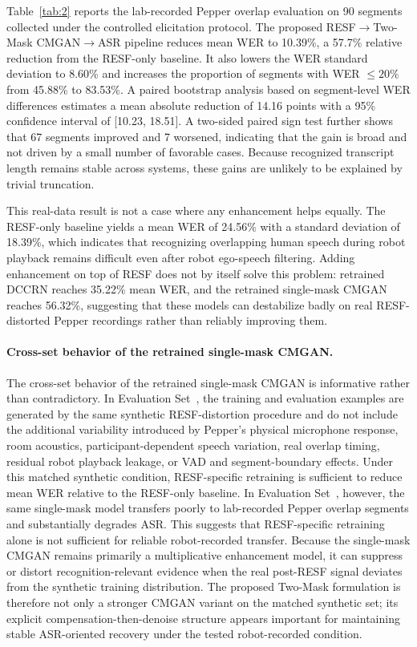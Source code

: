 \documentclass[manuscript,screen,review]{acmart}
\newcommand{\RomanNumeralCaps}[1]
    {\MakeUppercase{\romannumeral #1}}
\begin{document}
Table~\ref{tab:2} reports the lab-recorded Pepper overlap evaluation on 90 segments collected under the controlled elicitation protocol. The proposed RESF$\rightarrow$Two-Mask CMGAN$\rightarrow$ASR pipeline reduces mean WER to 10.39\%, a 57.7\% relative reduction from the RESF-only baseline. It also lowers the WER standard deviation to 8.60\% and increases the proportion of segments with WER $\leq 20\%$ from 45.88\% to 83.53\%. A paired bootstrap analysis based on segment-level WER differences estimates a mean absolute reduction of 14.16 points with a 95\% confidence interval of [10.23, 18.51]. A two-sided paired sign test further shows that 67 segments improved and 7 worsened, indicating that the gain is broad and not driven by a small number of favorable cases. Because recognized transcript length remains stable across systems, these gains are unlikely to be explained by trivial truncation.

This real-data result is not a case where any enhancement helps equally. The RESF-only baseline yields a mean WER of 24.56\% with a standard deviation of 18.39\%, which indicates that recognizing overlapping human speech during robot playback remains difficult even after robot ego-speech filtering. Adding enhancement on top of RESF does not by itself solve this problem: retrained DCCRN reaches 35.22\% mean WER, and the retrained single-mask CMGAN reaches 56.32\%, suggesting that these models can destabilize badly on real RESF-distorted Pepper recordings rather than reliably improving them.

\paragraph{Cross-set behavior of the retrained single-mask CMGAN.}
The cross-set behavior of the retrained single-mask CMGAN is informative rather than contradictory. In Evaluation Set~\RomanNumeralCaps{1}, the training and evaluation examples are generated by the same synthetic RESF-distortion procedure and do not include the additional variability introduced by Pepper's physical microphone response, room acoustics, participant-dependent speech variation, real overlap timing, residual robot playback leakage, or VAD and segment-boundary effects. Under this matched synthetic condition, RESF-specific retraining is sufficient to reduce mean WER relative to the RESF-only baseline. In Evaluation Set~\RomanNumeralCaps{3}, however, the same single-mask model transfers poorly to lab-recorded Pepper overlap segments and substantially degrades ASR. This suggests that RESF-specific retraining alone is not sufficient for reliable robot-recorded transfer. Because the single-mask CMGAN remains primarily a multiplicative enhancement model, it can suppress or distort recognition-relevant evidence when the real post-RESF signal deviates from the synthetic training distribution. The proposed Two-Mask formulation is therefore not only a stronger CMGAN variant on the matched synthetic set; its explicit compensation-then-denoise structure appears important for maintaining stable ASR-oriented recovery under the tested robot-recorded condition.
\end{document}
